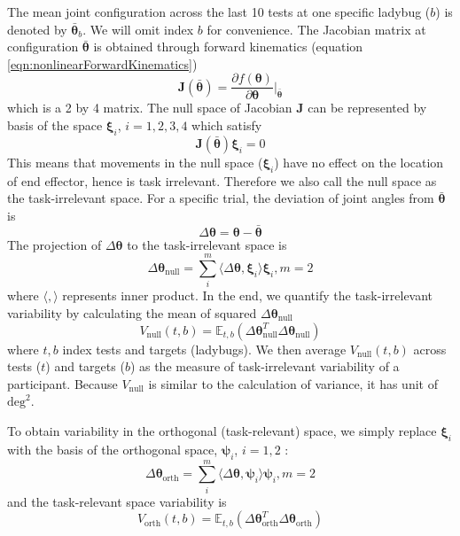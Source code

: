 The mean joint configuration across the last 10 tests at one specific ladybug ($ b $) is denoted by $ \bar{\bm{\theta}}_b $.
We will omit index $ b $ for convenience.
The Jacobian matrix at configuration $ \bar{\bm{\theta}} $ is obtained through forward kinematics (equation \ref{eqn:nonlinearForwardKinematics})
	\begin{equation}
	\bm{J}(\bar{\bm{\theta}}) = \frac{\partial f(\bm{\theta})}{\partial \bm{\theta}} \Big\rvert_{\bar{\bm{\theta}}}
	\end{equation}
which is a 2 by 4 matrix.
The null space of Jacobian $ \bm{J} $ can be represented by basis of the space $ \bm{\xi}_i $, $ i= 1,2,3,4 $ which satisfy
	\begin{equation}
	\bm{J}(\bar{\bm{\theta}}) \bm{\xi}_i = 0
	\end{equation}
This means that movements in the null space ($ \bm{\xi}_i $) have no effect on the location of end effector, hence is task irrelevant.
Therefore we also call the null space as the task-irrelevant space.
For a specific trial, the deviation of joint angles from $ \bar{\bm{\theta}} $ is
	\begin{equation}
	\Delta\bm{\theta} = \bm{\theta} - \bar{\bm{\theta}}
	\end{equation}
The projection of $ \Delta\bm{\theta} $ to the task-irrelevant space is
	\begin{equation}
	\Delta\bm{\theta}_{\text{null}} = \sum_i^m \langle \Delta\bm{\theta}, \bm{\xi}_i \rangle \bm{\xi}_i, m=2
	\end{equation}
where $ \langle,\rangle $ represents inner product.
In the end, we quantify the task-irrelevant variability by calculating the mean of squared $ \Delta\bm{\theta}_{\text{null}} $
	\begin{equation}
	V_{\text{null}}(t,b) = \mathbb{E}_{t,b} (\Delta\bm{\theta}_{\text{null}}^T\Delta\bm{\theta}_{\text{null}})
	\end{equation}
where $ t,b $ index tests and targets (ladybugs). 
We then average $ V_{\text{null}}(t,b) $ across tests ($ t $) and targets ($ b $) as the measure of task-irrelevant variability of a participant. 
Because $ V_{\text{null}} $ is similar to the calculation of variance, it has unit of $ \text{deg}^2 $.

To obtain variability in the orthogonal (task-relevant) space, we simply replace $ \bm{\xi}_i $ with the basis of the orthogonal space, $ \bm{\psi}_i $, $ i= 1,2 $  :
	\begin{equation}
	\Delta\bm{\theta}_{\text{orth}} = \sum_i^m \langle \Delta\bm{\theta}, \bm{\psi}_i \rangle \bm{\psi}_i, m=2
	\end{equation}
and the task-relevant space variability is
	\begin{equation}
	V_{\text{orth}}(t,b) = \mathbb{E}_{t,b} (\Delta\bm{\theta}_{\text{orth}}^T\Delta\bm{\theta}_{\text{orth}})
	\end{equation}

